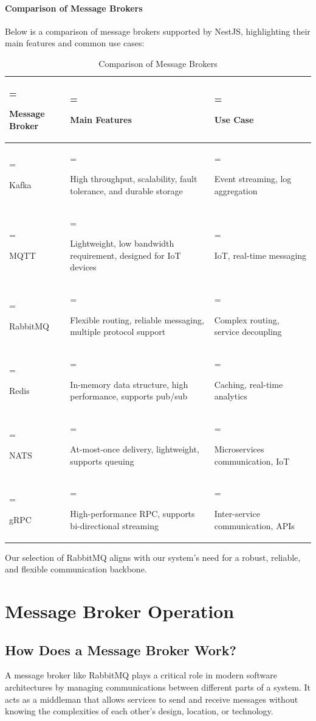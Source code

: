 \paragraph*{Comparison of Message Brokers}
Below is a comparison of message brokers supported by NestJS, highlighting their main features and common use cases:
\begin{table}[H]
    \centering
    \caption{Comparison of Message Brokers}
    \label{tab:message_brokers_comparison}
    \renewcommand{\arraystretch}{1.5} %
    \begin{tabularx}{\textwidth} {
            | >{\hsize=0.7\hsize\linewidth=\hsize\raggedright\arraybackslash}X
            | >{\hsize=1.2\hsize\linewidth=\hsize\raggedright\arraybackslash}X
            | >{\hsize=1.1\hsize\linewidth=\hsize\raggedright\arraybackslash}X |}
        \hline
        \rowcolor{primary} \textbf{Message Broker} & \textbf{Main Features} & \textbf{Use Case} \\
        \hline
        Kafka & High throughput, scalability, fault tolerance, and durable storage & Event streaming, log aggregation \\
        \hline
        MQTT & Lightweight, low bandwidth requirement, designed for IoT devices & IoT, real-time messaging \\
        \hline
        RabbitMQ & Flexible routing, reliable messaging, multiple protocol support & Complex routing, service decoupling \\
        \hline
        Redis & In-memory data structure, high performance, supports pub/sub & Caching, real-time analytics \\
        \hline
        NATS & At-most-once delivery, lightweight, supports queuing & Microservices communication, IoT \\
        \hline
        gRPC & High-performance RPC, supports bi-directional streaming & Inter-service communication, APIs \\
        \hline
    \end{tabularx}
    \end{table}

Our selection of RabbitMQ aligns with our system's need for a robust, reliable, and flexible communication backbone.

\section{Message Broker Operation}

\subsection*{How Does a Message Broker Work?}
A message broker like RabbitMQ plays a critical role in modern software architectures by managing communications between different parts of a system. It acts as a middleman that allows services to send and receive messages without knowing the complexities of each other’s design, location, or technology.

